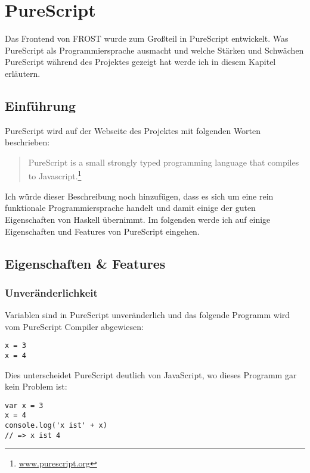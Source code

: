 \chapter{PureScript}
Das Frontend von FROST wurde zum Großteil in PureScript entwickelt. Was
Pure\-Script als Programmiersprache ausmacht und welche Stärken und Schwächen
PureScript während des Projektes gezeigt hat werde ich in diesem Kapitel
erläutern.
\section{Einführung}
PureScript wird auf der Webseite des Projektes mit folgenden Worten beschrieben:
\begin{quote}
  PureScript is a small strongly typed programming language that compiles to
  Javascript.\footnote{\url{www.purescript.org}}
\end{quote}
Ich würde dieser Beschreibung noch hinzufügen, dass es sich um eine rein
funktionale Programmiersprache handelt und damit einige der guten Eigenschaften
von Haskell übernimmt. Im folgenden werde ich auf einige Eigenschaften und
Features von PureScript eingehen.


\section{Eigenschaften \& Features}

\subsection*{Unveränderlichkeit}
Variablen sind in PureScript unveränderlich und das folgende Programm wird vom
PureScript Compiler abgewiesen:
\begin{lstlisting}
x = 3
x = 4
\end{lstlisting}
Dies unterscheidet PureScript deutlich von JavaScript, wo dieses Programm gar
kein Problem ist:
\begin{lstlisting}
var x = 3
x = 4
console.log('x ist' + x)
// => x ist 4
\end{lstlisting}

